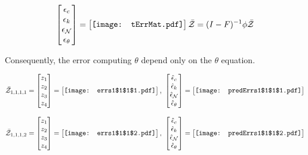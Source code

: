 \documentclass[12pt]{article}
\begin{document}
\begin{gather*}
\begin{bmatrix}
\epsilon_c\\\epsilon_k\\\epsilon_\mathcal{N}\\\epsilon_\theta
 \end{bmatrix}= \begin{bmatrix}
\vcenter{\hbox{\texttt{[image: tErrMat.pdf]}}}
 \end{bmatrix}\bar{\mathcal{Z}}= (I-F)^{-1} \phi  \bar{\mathcal{Z}}
\end{gather*}

Consequently, the error computing $\theta$ depend only on the $\theta$  equation.  

\begin{gather*}
\bar{\mathcal{Z}}_{1,1,1,1}=\begin{bmatrix}
z_1\\
z_2\\
z_3\\
z_4
 \end{bmatrix}= \begin{bmatrix}
\vcenter{\hbox{\texttt{[image: errs1\$1\$1\$1.pdf]}}}
 \end{bmatrix},\,\, \begin{bmatrix}
\hat{\epsilon}_c\\\hat{\epsilon}_k\\\hat{\epsilon}_\mathcal{N}\\\hat{\epsilon}_\theta
 \end{bmatrix}=\begin{bmatrix}
\vcenter{\hbox{\texttt{[image: predErrs1\$1\$1\$1.pdf]}}}
 \end{bmatrix}
\end{gather*}


\begin{gather*}
\bar{\mathcal{Z}}_{1,1,1,2}=\begin{bmatrix}
z_1\\
z_2\\
z_3\\
z_4
 \end{bmatrix}= \begin{bmatrix}
\vcenter{\hbox{\texttt{[image: errs1\$1\$1\$2.pdf]}}}
 \end{bmatrix},\,\, \begin{bmatrix}
\hat{\epsilon}_c\\\hat{\epsilon}_k\\\hat{\epsilon}_\mathcal{N}\\\hat{\epsilon}_\theta
 \end{bmatrix}=\begin{bmatrix}
\vcenter{\hbox{\texttt{[image: predErrs1\$1\$1\$2.pdf]}}}
 \end{bmatrix}
\end{gather*}
\end{document}
